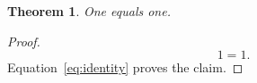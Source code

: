 \newtheorem{theorem}{Theorem}

\begin{theorem}\label{thm:equation-reference-clean}
One equals one.
\end{theorem}
\begin{proof}
\begin{equation}\label{eq:identity}
1=1.
\end{equation}
Equation~\eqref{eq:identity} proves the claim.
\end{proof}
